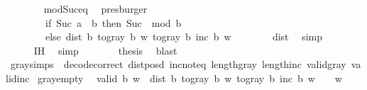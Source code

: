 \begin{isabellebody}
\ \ \ \ \ \ \isamarkupfalse%
\ mod{\isacharunderscore}{\kern0pt}Suc{\isacharunderscore}{\kern0pt}eq\ \isamarkupfalse%
\ presburger\isanewline
\ \ \ \ \isamarkupfalse%
\ \isamarkupfalse%
\ {\isachardoublequoteopen}{\isachardot}{\kern0pt}{\isachardot}{\kern0pt}{\isachardot}{\kern0pt}\ {\isacharequal}{\kern0pt}\ {\isacharparenleft}{\kern0pt}\isanewline
\ \ \ \ \ \ \ \ if\ Suc\ a\ {\isasymnoteq}\ b\ then\ Suc\ {}\ mod\ b\isanewline
\ \ \ \ \ \ \ \ else\ dist\ b\ {\isacharparenleft}{\kern0pt}to{\isacharunderscore}{\kern0pt}gray\ b\ w{\isacharparenright}{\kern0pt}\ {\isacharparenleft}{\kern0pt}to{\isacharunderscore}{\kern0pt}gray\ b\ {\isacharparenleft}{\kern0pt}inc\ b\ w{\isacharparenright}{\kern0pt}{\isacharparenright}{\kern0pt}{\isacharparenright}{\kern0pt}{\isachardoublequoteclose}\isanewline
\ \ \ \ \ \ \isamarkupfalse%
\ dist{}{\isacharunderscore}{\kern0pt}{}\ \isamarkupfalse%
\ simp\isanewline
\ \ \ \ \isamarkupfalse%
\ \isamarkupfalse%
\ {\isachardoublequoteopen}{\isachardot}{\kern0pt}{\isachardot}{\kern0pt}{\isachardot}{\kern0pt}\ {\isasymle}\ {}{\isachardoublequoteclose}\ \isamarkupfalse%
\ IH\ \isamarkupfalse%
\ simp\isanewline
\ \ \ \ \isamarkupfalse%
\ \isamarkupfalse%
\ {\isacharquery}{\kern0pt}thesis\ \isamarkupfalse%
\ blast\isanewline
\ \ \isamarkupfalse%
\isanewline
{}\isamarkupfalse%
%
\endisatagproof
{\isafoldproof}%
%
\isadelimproof
\isanewline
%
\endisadelimproof
\isanewline
{}\isamarkupfalse%
\ gray{\isacharunderscore}{\kern0pt}simps\ {\isacharequal}{\kern0pt}\ decode{\isacharunderscore}{\kern0pt}correct\ dist{\isacharunderscore}{\kern0pt}posd\ inc{\isacharunderscore}{\kern0pt}not{\isacharunderscore}{\kern0pt}eq\ length{\isacharunderscore}{\kern0pt}gray\ length{\isacharunderscore}{\kern0pt}inc\ valid{\isacharunderscore}{\kern0pt}gray\ valid{\isacharunderscore}{\kern0pt}inc\isanewline
\isanewline
{}\isamarkupfalse%
\ gray{\isacharunderscore}{\kern0pt}empty{\isacharcolon}{\kern0pt}\isanewline
\ \ {\isachardoublequoteopen}valid\ b\ w\ {\isasymLongrightarrow}\ {\isacharparenleft}{\kern0pt}dist\ b\ {\isacharparenleft}{\kern0pt}to{\isacharunderscore}{\kern0pt}gray\ b\ w{\isacharparenright}{\kern0pt}\ {\isacharparenleft}{\kern0pt}to{\isacharunderscore}{\kern0pt}gray\ b\ {\isacharparenleft}{\kern0pt}inc\ b\ w{\isacharparenright}{\kern0pt}{\isacharparenright}{\kern0pt}\ {\isacharequal}{\kern0pt}\ {}{\isacharparenright}{\kern0pt}\ {\isacharequal}{\kern0pt}\ {\isacharparenleft}{\kern0pt}w\ {\isacharequal}{\kern0pt}\ {\isacharbrackleft}{\kern0pt}{\isacharbrackright}{\kern0pt}{\isacharparenright}{\kern0pt}{\isachardoublequoteclose}\isanewline

\end{isabellebody}
